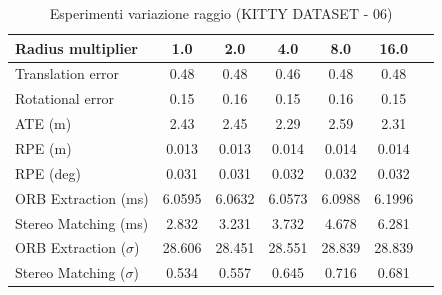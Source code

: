 \documentclass[12pt,a4paper]{report}
\begin{document}
\begin{table}[h]
    \centering
    \caption{Esperimenti variazione raggio (KITTY DATASET - 06) }
    \begin{tabular}{lcccccc}
        \toprule
        \rowcolor{gray!20}
        Radius multiplier & 1.0 & \cellcolor{orange!40}2.0 & 4.0 & 8.0 & 16.0 \\
        \midrule
        Translation error & 0.48 & 0.48 & \cellcolor{green!20}0.46 & 0.48 & 0.48 \\
        Rotational error & \cellcolor{green!20}0.15 & 0.16 & \cellcolor{green!20}0.15 & 0.16 & \cellcolor{green!20}0.15 \\
        ATE (m)           & 2.43 & 2.45 & \cellcolor{green!20}2.29 & 2.59 & 2.31 \\
        RPE (m)           & \cellcolor{green!20}0.013 & \cellcolor{green!20}0.013 & 0.014 & 0.014 & 0.014 \\
        RPE (deg)         & \cellcolor{green!20}0.031 & \cellcolor{green!20}0.031 & 0.032 & 0.032 & 0.032 \\
        ORB Extraction (ms) & 6.0595 & 6.0632 & \cellcolor{green!20}6.0573 & 6.0988 & 6.1996 \\
        Stereo Matching (ms) & 2.832 & 3.231 & 3.732 & 4.678 & 6.281 \\
        ORB Extraction ($\sigma$) & 28.606 & \cellcolor{green!20}28.451 & 28.551 & 28.839 & 28.839 \\
        Stereo Matching ($\sigma$) & \cellcolor{green!20}0.534 & 0.557 & 0.645 & 0.716 & 0.681 \\
        \bottomrule
    \end{tabular}
\end{table}
\end{document}
